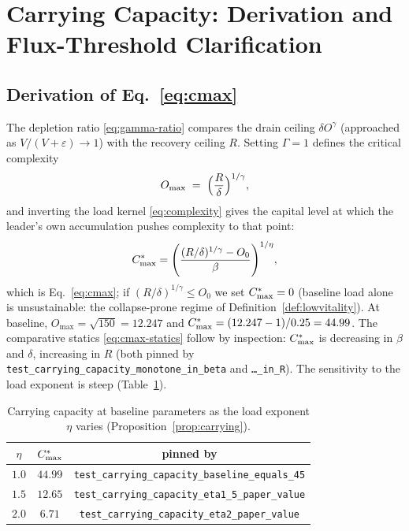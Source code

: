 \section{Carrying Capacity: Derivation and Flux-Threshold Clarification}
\label{app:carrying}

\subsection{Derivation of Eq.~\eqref{eq:cmax}}

The depletion ratio \eqref{eq:gamma-ratio} compares the drain ceiling
$\delta O^{\gamma}$ (approached as $V/(V+\varepsilon)\to1$) with the
recovery ceiling $R$. Setting $\Gamma=1$ defines the critical complexity
\[
O_{\max} \;=\; \Bigl(\frac{R}{\delta}\Bigr)^{1/\gamma},
\]
and inverting the load kernel \eqref{eq:complexity} gives the capital level
at which the leader's own accumulation pushes complexity to that point:
\[
C^{*}_{\max}
= \Biggl(\frac{(R/\delta)^{1/\gamma}-O_0}{\beta}\Biggr)^{1/\eta},
\]
which is Eq.~\eqref{eq:cmax}; if $(R/\delta)^{1/\gamma}\le O_0$ we set
$C^{*}_{\max}=0$ (baseline load alone is unsustainable: the collapse-prone regime
of Definition~\ref{def:lowvitality}). At baseline,
$O_{\max}=\sqrt{150}=12.247$ and $C^{*}_{\max}=(12.247-1)/0.25=44.99$. The
comparative statics \eqref{eq:cmax-statics} follow by inspection:
$C^{*}_{\max}$ is decreasing in $\beta$ and $\delta$, increasing in $R$
(both pinned by \texttt{test\_carrying\_capacity\_monotone\_in\_beta} and
\texttt{\ldots\_in\_R}). The sensitivity to the load exponent is steep
(Table~\ref{tab:cmax-eta}).

\begin{table}[h]
\centering
\caption{Carrying capacity at baseline parameters as the load exponent
$\eta$ varies (Proposition~\ref{prop:carrying}).}
\label{tab:cmax-eta}
\vspace{0.4em}
\begin{tabular}{ccc}
\toprule
$\eta$ & $C^{*}_{\max}$ & pinned by \\
\midrule
$1.0$ & $44.99$ & \texttt{test\_carrying\_capacity\_baseline\_equals\_45}\\
$1.5$ & $12.65$ & \texttt{test\_carrying\_capacity\_eta1\_5\_paper\_value}\\
$2.0$ & $6.71$  & \texttt{test\_carrying\_capacity\_eta2\_paper\_value}\\
\bottomrule
\end{tabular}
\end{table}

